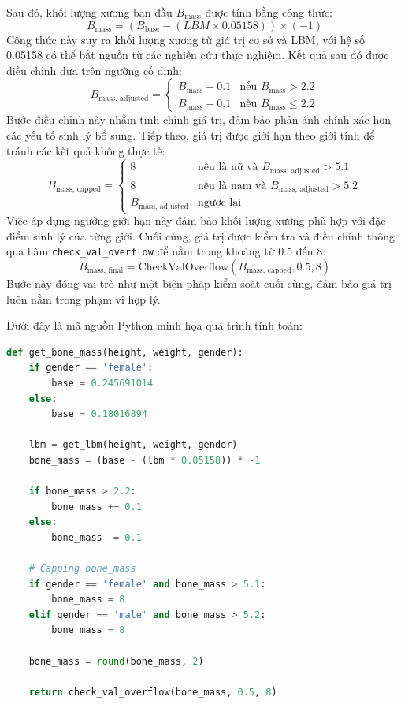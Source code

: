 Sau đó, khối lượng xương ban đầu \( B_{\text{mass}} \) được tính bằng công thức:
\[
B_{\text{mass}} = \left(B_{\text{base}} - (LBM \times 0.05158)\right) \times (-1)
\]
Công thức này suy ra khối lượng xương từ giá trị cơ sở và LBM, với hệ số 0.05158 có thể bắt nguồn từ các nghiên cứu thực nghiệm. Kết quả sau đó được điều chỉnh dựa trên ngưỡng cố định:
\[
B_{\text{mass, adjusted}} = 
\begin{cases} 
B_{\text{mass}} + 0.1 & \text{nếu } B_{\text{mass}} > 2.2 \\
B_{\text{mass}} - 0.1 & \text{nếu } B_{\text{mass}} \leq 2.2
\end{cases}
\]
Bước điều chỉnh này nhằm tinh chỉnh giá trị, đảm bảo phản ánh chính xác hơn các yếu tố sinh lý bổ sung. Tiếp theo, giá trị được giới hạn theo giới tính để tránh các kết quả không thực tế:
\[
B_{\text{mass, capped}} = 
\begin{cases} 
8 & \text{nếu là nữ và } B_{\text{mass, adjusted}} > 5.1 \\
8 & \text{nếu là nam và } B_{\text{mass, adjusted}} > 5.2 \\
B_{\text{mass, adjusted}} & \text{ngược lại}
\end{cases}
\]
Việc áp dụng ngưỡng giới hạn này đảm bảo khối lượng xương phù hợp với đặc điểm sinh lý của từng giới. Cuối cùng, giá trị được kiểm tra và điều chỉnh thông qua hàm \texttt{check\_val\_overflow} để nằm trong khoảng từ 0.5 đến 8:
\[
B_{\text{mass, final}} = \text{CheckValOverflow}(B_{\text{mass, capped}}, 0.5, 8)
\]
Bước này đóng vai trò như một biện pháp kiểm soát cuối cùng, đảm bảo giá trị luôn nằm trong phạm vi hợp lý.

Dưới đây là mã nguồn Python minh họa quá trình tính toán:

\begin{lstlisting}[language=python,caption={Hàm tính toán chỉ số khối lượng xương của cơ thể}]
def get_bone_mass(height, weight, gender):
    if gender == 'female':
        base = 0.245691014
    else:
        base = 0.18016894

    lbm = get_lbm(height, weight, gender)
    bone_mass = (base - (lbm * 0.05158)) * -1

    if bone_mass > 2.2:
        bone_mass += 0.1
    else:
        bone_mass -= 0.1

    # Capping bone_mass
    if gender == 'female' and bone_mass > 5.1:
        bone_mass = 8
    elif gender == 'male' and bone_mass > 5.2:
        bone_mass = 8

    bone_mass = round(bone_mass, 2)

    return check_val_overflow(bone_mass, 0.5, 8)
\end{lstlisting}

